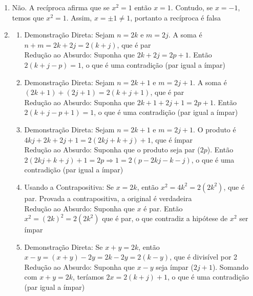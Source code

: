 \begin{enumerate}
    \item Não. A recíproca afirma que se $x^2=1$ então $x=1$.
      Contudo, se $x = -1$, temos que $x^2 = 1$.
      Assim,  $x=\pm 1 \neq 1$, portanto a recíproca é falsa

    \item
    \begin{enumerate}
        \item
            Demonstração Direta:
            Sejam $n = 2k$ e $m = 2j$.
            A soma é $n + m = 2k + 2j = 2(k + j)$, que é par \\
            Redução ao Absurdo: Suponha que $2k + 2j = 2p + 1$.
            Então $2(k + j - p) = 1$, o que é uma contradição (par igual a ímpar)

        \item
            Demonstração Direta:
            Sejam $n = 2k + 1$ e $m = 2j + 1$.
            A soma é $(2k + 1) + (2j + 1) = 2(k + j + 1)$, que é par \\
            Redução ao Absurdo:
            Suponha que $2k+1 + 2j+1 = 2p + 1$.
            Então $2(k + j - p +1) = 1$, o que é uma contradição (par igual a ímpar)

        \item
            Demonstração Direta:
            Sejam $n = 2k + 1$ e $m = 2j + 1$.
            O produto é $4kj + 2k + 2j + 1 = 2(2kj + k + j) + 1$, que é ímpar \\
            Redução ao Absurdo:
            Suponha que o produto seja par ($2p$).
            Então $2(2kj+k+j) + 1 = 2p \Rightarrow 1 = 2(p - 2kj - k - j)$,
            o que é uma contradição (par igual a ímpar)

        \item
            Usando a Contrapositiva:
            Se $x=2k$, então $x^2 = 4k^2 = 2(2k^2)$, que é par.
            Provada a contrapositiva, a original é verdadeira \\
            Redução ao Absurdo:
            Suponha que $x$ é par.
            Então $x^2 = (2k)^2 = 2(2k^2)$ que é par,
            o que contradiz a hipótese de $x^2$ ser ímpar

        \item
            Demonstração Direta:
            Se $x + y = 2k$, então $x - y = (x + y) - 2y = 2k - 2y = 2(k - y)$,
            que é divisível por 2 \\
            Redução ao Absurdo:
            Suponha que $x - y$ seja ímpar ($2j+1$).
            Somando com $x+y=2k$, teríamos $2x = 2(k+j)+1$,
            o que é uma contradição (par igual a ímpar)
    \end{enumerate}


\end{enumerate}
